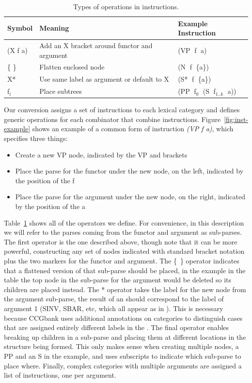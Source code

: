 \begin{table}
\centering
\begin{tabular}{lll}
	\hline
		Symbol & Meaning & Example Instruction \\
	\hline
	\hline
		(X f a) & Add an X bracket around functor and argument & (VP$\;$ f$\;$ a) \\
		\{ \} & Flatten enclosed node & (N$\;$ f$\;$ \{a\}) \\
		X* & Use same label as argument or default to X & (S*$\;$ f$\;$ \{a\}) \\
		f$_i$ & Place subtrees &  (PP$\;$ f$_0$$\;$ (S$\;$ f$_{1..k}$$\;$ a)) \\
	\hline
\end{tabular}
\caption[Types of operations in instructions in our \ccg to \ptb conversion.]{\label{tab:operators}
  Types of operations in instructions.
}
\end{table}

Our conversion assigns a set of instructions to each lexical category and defines generic operations for each combinator that combine instructions.
Figure~\ref{fig:inst-example} shows an example of a common form of instruction \emph{(VP f a)}, which specifies three things:

\begin{itemize}
  \item Create a new VP node, indicated by the VP and brackets
  \item Place the \ptb parse for the functor under the new node, on the left, indicated by the position of the f
  \item Place the \ptb parse for the argument under the new node, on the right, indicated by the position of the a
\end{itemize}

Table~\ref{tab:operators} shows all of the operators we define.
For convenience, in this description we will refer to the parses coming from the functor and argument as sub-parses.
The first operator is the one described above, though note that it can be more powerful, constructing any set of \ptb nodes indicated with standard bracket notation plus the two markers for the functor and argument.
The \{~\} operator indicates that a flattened version of that sub-parse should be placed, in the example in the table the top node in the sub-parse for the argument would be deleted so its children are placed instead.
The * operator takes the label for the new node from the argument sub-parse, \myeg the result of an  should correspond to the label of argument 1 (SINV, SBAR, etc, which all appear as  in \ccg).
This is necessary because CCGbank uses additional annotations on categories to distinguish cases that are assigned entirely different labels in the \ptb.
The final operator enables breaking up children in a sub-parse and placing them at different locations in the structure being formed.
This only makes sense when creating multiple nodes, a PP and an S in the example, and uses subscripts to indicate which sub-parse to place where.
Finally, complex categories with multiple arguments are assigned a list of instructions, one per argument.


